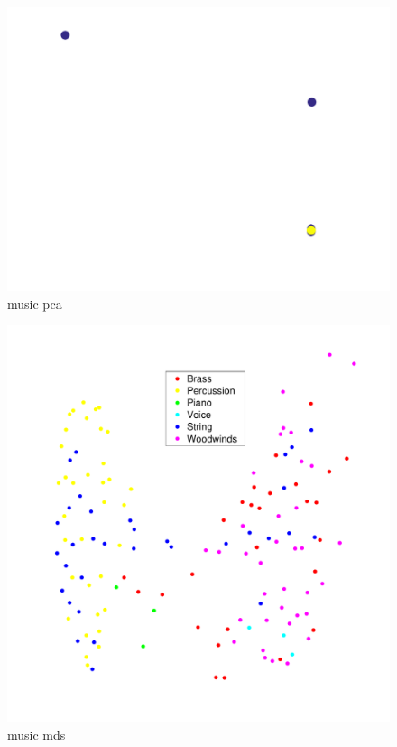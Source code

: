 \documentclass[12pt,a4paper,fleqn]{tufte-handout}
\begin{document}
    \begin{figure}
  \begin{center}
  \includegraphics[scale=.5]{figures/music_pca}
  \caption{music pca}
  \end{center}
  \end{figure}

 \begin{figure}
  \begin{center}
  \includegraphics[scale=.5]{figures/music_mds}
  \caption{music mds}
  \end{center}
  \end{figure}
\end{document}
